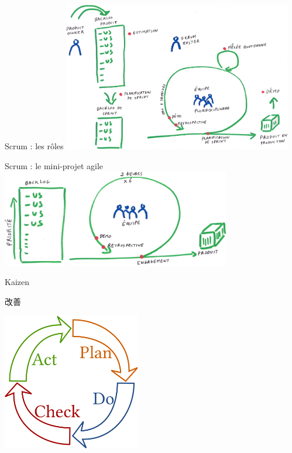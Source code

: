 \documentclass{beamer}
\begin{document}
\begin{frame}{Scrum : les rôles}
  \center
  \includegraphics[width=10cm]{includes/scrum3}
\end{frame}

\begin{frame}{Scrum : le mini-projet agile}
  \center
  \includegraphics[width=10cm]{includes/simulation}
\end{frame}

\begin{frame}{Kaizen 
    {\begin{CJK*}{UTF8}{mj} 改善 \end{CJK*}}
  }
  \center
  \includegraphics[width=6cm]{includes/pdca}
\end{frame}
\end{document}
